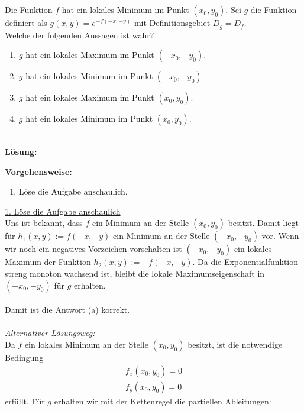\subsection*{}
Die Funktion $ f $ hat ein lokales Minimum im Punkt $ (x_0,y_0) $.
Sei $ g $ die Funktion definiert als $ g(x,y) = e^{-f(-x,-y)} $ mit Definitionsgebiet $ D_g = D_f $.\\
Welche der folgenden Aussagen ist wahr?
\renewcommand{\labelenumi}{(\alph{enumi})}
\begin{enumerate}
	\item $ g $ hat ein lokales Maximum im Punkt $ (-x_0,-y_0) $.
	\item $ g $ hat ein lokales Minimum im Punkt $ (-x_0,-y_0) $.
	\item $ g $ hat ein lokales Maximum im Punkt $ (x_0,y_0) $.
	\item $ g $ hat ein lokales Minimum im Punkt $ (x_0,y_0) $.
\end{enumerate}
\ \\
\textbf{Lösung:}
\begin{mdframed}
	\underline{\textbf{Vorgehensweise:}}
	\renewcommand{\labelenumi}{\theenumi.}
	\begin{enumerate}
		\item Löse die Aufgabe anschaulich.
	\end{enumerate}
\end{mdframed}
\underline{1. Löse die Aufgabe anschaulich}\\
Uns ist bekannt, dass $ f $ ein Minimum an der Stelle $ (x_0,y_0) $ besitzt.
Damit liegt für $ h_1(x,y) := f(-x,-y)$ ein Minimum an der Stelle $ (-x_0,-y_0) $ vor.
Wenn wir noch ein negatives Vorzeichen vorschalten ist $ (-x_0,-y_0) $ ein lokales Maximum der Funktion $ h_2(x,y) := -f(-x,-y) $.
Da die Exponentialfunktion streng monoton wachsend ist, bleibt die lokale Maximumseigenschaft in $ (-x_0,-y_0) $ für $ g $ erhalten.\\
\\
Damit ist die Antwort (a) korrekt.\\
\\
\textit{Alternativer Lösungsweg:}\\
Da $ f $ ein lokales Minimum an der Stelle $ (x_0,y_0) $ besitzt, ist die notwendige Bedingung 
\begin{align*}
	f_x(x_0,y_0) =0\\
	f_y(x_0,y_0) =0
\end{align*}
erfüllt. Für $ g $ erhalten wir mit der Kettenregel die partiellen Ableitungen:
